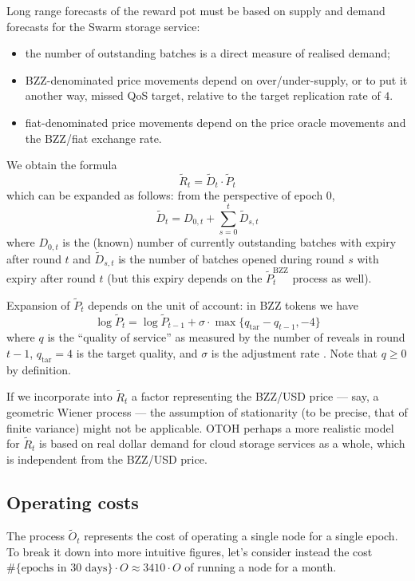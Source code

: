 Long range forecasts of the reward pot must be based on supply and demand forecasts for the Swarm storage service:
\begin{itemize}
  \item 
    the number of outstanding batches is a direct measure of realised demand;
  \item
    BZZ-denominated price movements depend on over/under-supply, or to put it another way, missed QoS target, relative to the target replication rate of $4$.
  \item
    fiat-denominated price movements depend on the price oracle movements and the BZZ/fiat exchange rate.
\end{itemize}
%
We obtain the formula
\[
  \tilde{R}_t = \tilde{D}_t \cdot \tilde{P}_t 
\]
which can be expanded as follows: from the perspective of epoch $0$,
\[
  \tilde{D}_t = D_{0,t} + \sum_{s=0}^{t} \tilde{D}_{s,t}
\]
where $D_{0,t}$ is the (known) number of currently outstanding batches with expiry after round $t$ and $\tilde{D}_{s,t}$ is the number of batches opened during round $s$ with expiry after round $t$ (but this expiry depends on the $\tilde{P}_t^\mathrm{BZZ}$ process as well).

Expansion of $\tilde{P}_t$ depends on the unit of account: in BZZ tokens we have 
\[
  \log\tilde{P}_t = \log\tilde{P}_{t-1} + \sigma\cdot \max\{q_\mathrm{tar} - q_{t-1},-4\}
\]
where $q$ is the ``quality of service'' as measured by the number of reveals in round $t-1$, $q_\mathrm{tar}=4$ is the target quality, and $\sigma$ is the adjustment rate \cite[\S3.4.5]{BOS}.
%
Note that $q\geq 0$ by definition.



\begin{remark}

  If we incorporate into $\tilde R_t$ a factor representing the BZZ/USD price --- say, a geometric Wiener process --- the assumption of stationarity (to be precise, that of finite variance) might not be applicable.
  OTOH perhaps a more realistic model for $\tilde R_t$ is based on real dollar demand for cloud storage services as a whole, which is independent from the BZZ/USD price.

\end{remark}


\subsection{Operating costs}

The process $\tilde{O}_t$ represents the cost of operating a single node for a single epoch.
%
To break it down into more intuitive figures, let's consider instead the cost $\#\{\text{epochs in 30 days}\}\cdot O\approx 3410\cdot O$ of running a node for a month.

